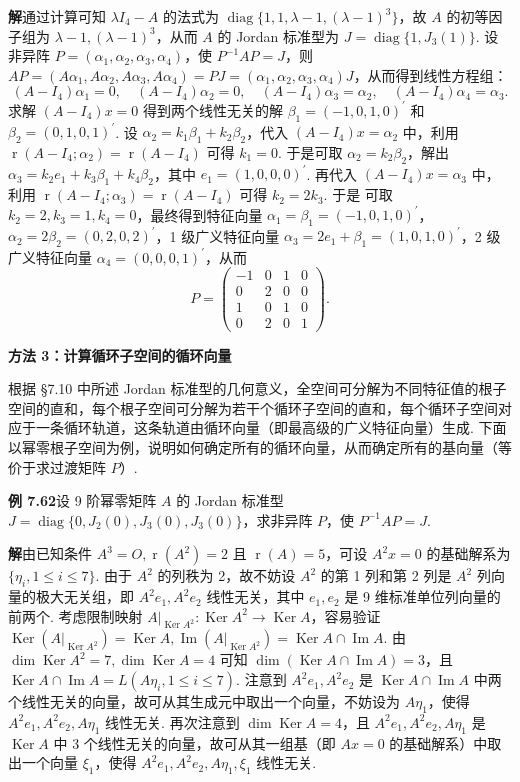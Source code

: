 \documentclass[UTF8,12pt,a4paper,fontset=fandol]{ctexart}
\begin{document}
\noindent\textbf{解}\quad 通过计算可知 $\lambda I_4-A$ 的法式为 $\operatorname{diag}\{1,1,\lambda-1,(\lambda-1)^3\}$，故 $A$ 的初等因子组为 $\lambda-1,(\lambda-1)^3$，从而 $A$ 的 Jordan 标准型为 $J=\operatorname{diag}\{1,J_3(1)\}$. 设非异阵 $P=(\alpha_1,\alpha_2,\alpha_3,\alpha_4)$，使 $P^{-1}AP=J$，则 $AP=(A\alpha_1,A\alpha_2,A\alpha_3,A\alpha_4)=PJ=(\alpha_1,\alpha_2,\alpha_3,\alpha_4)J$，从而得到线性方程组：
\[
(A-I_4)\alpha_1=0,\quad (A-I_4)\alpha_2=0,\quad (A-I_4)\alpha_3=\alpha_2,\quad (A-I_4)\alpha_4=\alpha_3.
\]
求解 $(A-I_4)x=0$ 得到两个线性无关的解 $\beta_1=(-1,0,1,0)^{\prime}$ 和 $\beta_2=(0,1,0,1)^{\prime}$. 设 $\alpha_2=k_1\beta_1+k_2\beta_2$，代入 $(A-I_4)x=\alpha_2$ 中，利用 $\operatorname{r}(A-I_4;\alpha_2)=\operatorname{r}(A-I_4)$ 可得 $k_1=0$. 于是可取 $\alpha_2=k_2\beta_2$，解出 $\alpha_3=k_2e_1+k_3\beta_1+k_4\beta_2$，其中 $e_1=(1,0,0,0)^{\prime}$. 再代入 $(A-I_4)x=\alpha_3$ 中，利用 $\operatorname{r}(A-I_4;\alpha_3)=\operatorname{r}(A-I_4)$ 可得 $k_2=2k_3$. 于是
可取 $k_2=2,k_3=1,k_4=0$，最终得到特征向量 $\alpha_1=\beta_1=(-1,0,1,0)^{\prime}$，$\alpha_2=2\beta_2=(0,2,0,2)^{\prime}$，1 级广义特征向量 $\alpha_3=2e_1+\beta_1=(1,0,1,0)^{\prime}$，2 级广义特征向量 $\alpha_4=(0,0,0,1)^{\prime}$，从而
\[
P=\left(\begin{array}{rrrr}
-1&0&1&0\\
0&2&0&0\\
1&0&1&0\\
0&2&0&1
\end{array}\right).
\]

\noindent\textbf{方法 3：计算循环子空间的循环向量}

根据 §7.10 中所述 Jordan 标准型的几何意义，全空间可分解为不同特征值的根子空间的直和，每个根子空间可分解为若干个循环子空间的直和，每个循环子空间对应于一条循环轨道，这条轨道由循环向量（即最高级的广义特征向量）生成. 下面以幂零根子空间为例，说明如何确定所有的循环向量，从而确定所有的基向量（等价于求过渡矩阵 $P$）.

\noindent\textbf{例 7.62}\quad 设 9 阶幂零矩阵 $A$ 的 Jordan 标准型 $J=\operatorname{diag}\{0,J_2(0),J_3(0),J_3(0)\}$，求非异阵 $P$，使 $P^{-1}AP=J$.

\noindent\textbf{解}\quad 由已知条件 $A^3=O,\operatorname{r}(A^2)=2$ 且 $\operatorname{r}(A)=5$，可设 $A^2x=0$ 的基础解系为 $\{\eta_i,1\le i\le 7\}$. 由于 $A^2$ 的列秩为 2，故不妨设 $A^2$ 的第 1 列和第 2 列是 $A^2$ 列向量的极大无关组，即 $A^2e_1,A^2e_2$ 线性无关，其中 $e_1,e_2$ 是 9 维标准单位列向量的前两个. 考虑限制映射 $A|_{\operatorname{Ker}A^2}:\operatorname{Ker}A^2\to\operatorname{Ker}A$，容易验证 $\operatorname{Ker}(A|_{\operatorname{Ker}A^2})=\operatorname{Ker}A,\operatorname{Im}(A|_{\operatorname{Ker}A^2})=\operatorname{Ker}A\cap\operatorname{Im}A$. 由 $\dim\operatorname{Ker}A^2=7,\dim\operatorname{Ker}A=4$ 可知 $\dim(\operatorname{Ker}A\cap\operatorname{Im}A)=3$，且 $\operatorname{Ker}A\cap\operatorname{Im}A=L(A\eta_i,1\le i\le 7)$. 注意到 $A^2e_1,A^2e_2$ 是 $\operatorname{Ker}A\cap\operatorname{Im}A$ 中两个线性无关的向量，故可从其生成元中取出一个向量，不妨设为 $A\eta_1$，使得 $A^2e_1,A^2e_2,A\eta_1$ 线性无关. 再次注意到 $\dim\operatorname{Ker}A=4$，且 $A^2e_1,A^2e_2,A\eta_1$ 是 $\operatorname{Ker}A$ 中 3 个线性无关的向量，故可从其一组基（即 $Ax=0$ 的基础解系）中取出一个向量 $\xi_1$，使得 $A^2e_1,A^2e_2,A\eta_1,\xi_1$ 线性无关.
\end{document}
